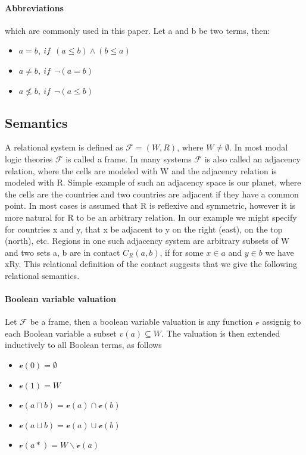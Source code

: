 \documentclass{article}
\begin{document}
	\paragraph{Abbreviations}
which are commonly used in this paper. Let a and b be two terms, then:
	\begin{itemize}
		\item $a = b,\:\textit{if}\:\: (a \le b) \land (b \le a)$
		\item $a \neq b,\:\textit{if}\:\: \neg (a = b) $
		\item $a \nleq b,\:\textit{if}\:\: \neg (a \le b)$
	\end{itemize}

	\subsection{Semantics}
		A relational system is defined as $\mathcal{F} = (W, R)$, where $W \neq \emptyset$. In most modal logic theories $\mathcal{F}$ is called a frame. In many systems $\mathcal{F}$ is also called an adjacency relation, where the cells are modeled with W and the adjacency relation is modeled with R. Simple example of such an adjacency space is our planet, where the cells are the countries and two countries are adjacent if they have a common point. In most cases is assumed that R is reflexive and symmetric, however it is more natural for R to be an arbitrary relation. In our example we might specify for countries x and y, that x be adjacent to y on the right (east), on the top (north), etc. Regions in one such adjacency system are arbitrary subsets of W and two sets a, b are in contact $C_R(a, b)$, if for some $x \in a$ and $y \in b$ we have xRy. This relational definition of the contact suggests that we give the following relational semantics. 

	\paragraph{Boolean variable valuation}
Let $\mathcal{F}$  be a frame, then a boolean variable valuation is any function $\mathscr{v}$ assignig to each Boolean variable a subset $v(a) \subseteq W$. The valuation is then extended inductively to all Boolean terms, as follows
		\begin{itemize}
			\item $\mathscr{v}(0) = \emptyset$
			\item $\mathscr{v}(1) = W$
			\item $\mathscr{v}(a \sqcap b) = \mathscr{v}(a) \cap \mathscr{v}(b)$
			\item $\mathscr{v}(a \sqcup b) = \mathscr{v}(a) \cup \mathscr{v}(b)$
			\item $\mathscr{v}(a*) = W \backslash  \mathscr{v}(a)$
		\end{itemize}
\end{document}
